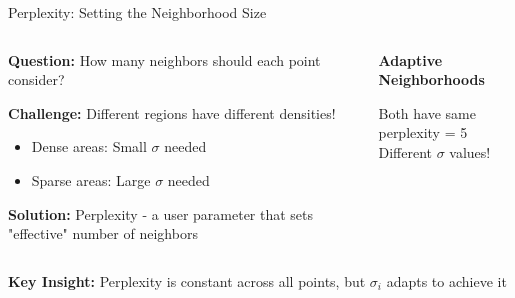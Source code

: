 \documentclass[aspectratio=169]{beamer}
\begin{document}
\begin{frame}{Perplexity: Setting the Neighborhood Size}
\begin{columns}
\begin{tcolorbox}[colback=blue!5, colframe=blue!40, title={\textbf{The Problem We're Solving}}]
\textbf{Question:} How many neighbors should each point consider?

\vspace{3mm}
\textbf{Challenge:} Different regions have different densities!
\begin{itemize}
\item Dense areas: Small $\sigma$ needed
\item Sparse areas: Large $\sigma$ needed
\end{itemize}

\vspace{3mm}
\textbf{Solution:} Perplexity - a user parameter that sets "effective" number of neighbors
\end{tcolorbox}

\begin{center}
\textbf{Adaptive Neighborhoods}\\[3mm]

\vspace{3mm}
\begin{tcolorbox}[colback=green!5, colframe=green!40]
\centering\small
Both have same perplexity = 5\\
Different $\sigma$ values!
\end{tcolorbox}
\end{center}
\end{columns}

\vspace{1mm}
\begin{tcolorbox}[colback=yellow!10, colframe=orange!60]
\centering
\textbf{Key Insight:} Perplexity is constant across all points, but $\sigma_i$ adapts to achieve it
\end{tcolorbox}
\end{frame}
\end{document}
